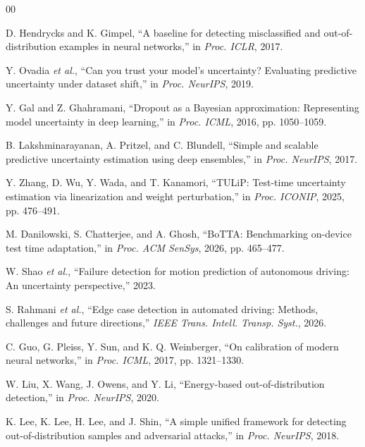 \documentclass[conference]{IEEEtran}
\begin{document}
\begin{thebibliography}{00}
\footnotesize

 D. Hendrycks and K. Gimpel, ``A baseline for detecting misclassified and out-of-distribution examples in neural networks,'' in \textit{Proc. ICLR}, 2017.

 Y. Ovadia \textit{et al.}, ``Can you trust your model's uncertainty? Evaluating predictive uncertainty under dataset shift,'' in \textit{Proc. NeurIPS}, 2019.

 Y. Gal and Z. Ghahramani, ``Dropout as a Bayesian approximation: Representing model uncertainty in deep learning,'' in \textit{Proc. ICML}, 2016, pp. 1050--1059.

 B. Lakshminarayanan, A. Pritzel, and C. Blundell, ``Simple and scalable predictive uncertainty estimation using deep ensembles,'' in \textit{Proc. NeurIPS}, 2017.

 Y. Zhang, D. Wu, Y. Wada, and T. Kanamori, ``TULiP: Test-time uncertainty estimation via linearization and weight perturbation,'' in \textit{Proc. ICONIP}, 2025, pp. 476--491.

 M. Danilowski, S. Chatterjee, and A. Ghosh, ``BoTTA: Benchmarking on-device test time adaptation,'' in \textit{Proc. ACM SenSys}, 2026, pp. 465--477.

 W. Shao \textit{et al.}, ``Failure detection for motion prediction of autonomous driving: An uncertainty perspective,'' 2023.

 S. Rahmani \textit{et al.}, ``Edge case detection in automated driving: Methods, challenges and future directions,'' \textit{IEEE Trans. Intell. Transp. Syst.}, 2026.

 C. Guo, G. Pleiss, Y. Sun, and K. Q. Weinberger, ``On calibration of modern neural networks,'' in \textit{Proc. ICML}, 2017, pp. 1321--1330.

 W. Liu, X. Wang, J. Owens, and Y. Li, ``Energy-based out-of-distribution detection,'' in \textit{Proc. NeurIPS}, 2020.

 K. Lee, K. Lee, H. Lee, and J. Shin, ``A simple unified framework for detecting out-of-distribution samples and adversarial attacks,'' in \textit{Proc. NeurIPS}, 2018.


\end{thebibliography}
\end{document}
